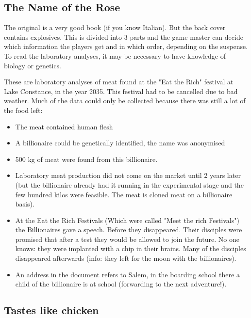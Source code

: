 \subsection{The Name of the Rose}

The original is a very good book (if you know Italian). But the back cover contains explosives.
This is divided into 3 parts and the game master can decide which information the players get and in which order, depending on the suspense.
To read the laboratory analyses, it may be necessary to have knowledge of biology or genetics.

These are laboratory analyses of meat found at the "Eat the Rich" festival at Lake Constance, in the year 2035. This festival had to be cancelled due to bad weather. Much of the data could only be collected because there was still a lot of the food left:

\begin{itemize}
    \item The meat contained human flesh
    \item A billionaire could be genetically identified, the name was anonymised
    \item 500 kg of meat were found from this billionaire.
    \item Laboratory meat production did not come on the market until 2 years later (but the billionaire already had it running in the experimental stage and the few hundred kilos were feasible. The meat is cloned meat on a billionaire basis).
    \item At the Eat the Rich Festivals (Which were called "Meet the rich Festivals") the Billionaires gave a speech. Before they disappeared. Their disciples were promised that after a test they would be allowed to join the future. No one knows: they were implanted with a chip in their brains. Many of the disciples disappeared afterwards (info: they left for the moon with the billionaires).
    \item An address in the document refers to Salem, in the boarding school there a child of the billionaire is at school (forwarding to the next adventure!).
\end{itemize}


\subsection{Tastes like chicken}

